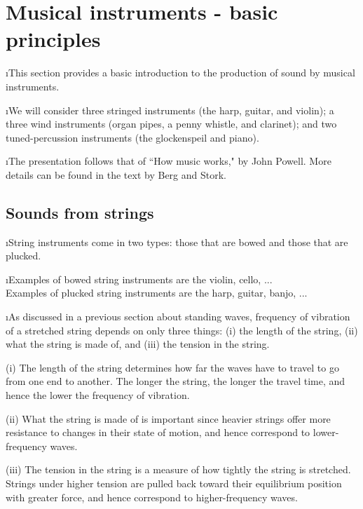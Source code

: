 \section{Musical instruments - basic principles}
\bi

\i This section provides a basic introduction to 
the production of sound by musical instruments.

\i We will consider three stringed instruments 
(the harp, guitar, and violin); 
a three wind instruments 
(organ pipes, a penny whistle, and clarinet);
and two tuned-percussion instruments
(the glockenspeil and piano).

\i The presentation follows that of ``How music works,"
by John Powell.
More details can be found in the text by Berg and Stork.

\ei
\subsection{Sounds from strings}
\bi

\i String instruments come in two types: 
those that are bowed and those that are plucked.

\i Examples of bowed string instruments are the 
violin, cello, ...\\
Examples of plucked string instruments are the 
harp, guitar, banjo, ...


\i As discussed in a previous section about 
standing waves, frequency of vibration of a stretched
string depends on only three things:
(i) the length of the string, 
(ii) what the string is made of, and
(iii) the tension in the string.

(i) The length of the string determines how far
the waves have to travel to go from one end to
another.
The longer the string, the longer the travel
time, and hence the lower the frequency of vibration.

(ii) What the string is made of is important 
since heavier strings offer more resistance 
to changes in their state of motion, and hence 
correspond to lower-frequency waves.

(iii) The tension in the string is a measure of 
how tightly the string is stretched.
Strings under higher tension are pulled back toward
their equilibrium position with greater force,
and hence correspond to higher-frequency waves.

